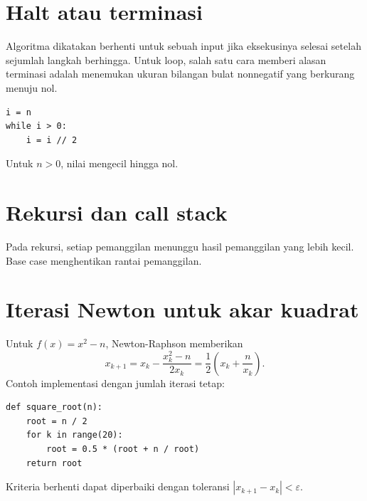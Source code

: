 \documentclass[11pt,a4paper]{report}
\newcommand{\kode}[1]{\texttt{\detokenize{#1}}}
\begin{document}
\section{Halt atau terminasi}
Algoritma dikatakan berhenti untuk sebuah input jika eksekusinya selesai setelah sejumlah langkah berhingga. Untuk loop, salah satu cara memberi alasan terminasi adalah menemukan ukuran bilangan bulat nonnegatif yang berkurang menuju nol.

\begin{lstlisting}
i = n
while i > 0:
    i = i // 2
\end{lstlisting}
Untuk $n>0$, nilai \kode{i} mengecil hingga nol.

\section{Rekursi dan call stack}
Pada rekursi, setiap pemanggilan menunggu hasil pemanggilan yang lebih kecil. Base case menghentikan rantai pemanggilan.

\section{Iterasi Newton untuk akar kuadrat}
Untuk $f(x)=x^2-n$, Newton-Raphson memberikan
\[
x_{k+1}=x_k-\frac{x_k^2-n}{2x_k}
       =\frac12\left(x_k+\frac{n}{x_k}\right).
\]
Contoh implementasi dengan jumlah iterasi tetap:
\begin{lstlisting}
def square_root(n):
    root = n / 2
    for k in range(20):
        root = 0.5 * (root + n / root)
    return root
\end{lstlisting}
Kriteria berhenti dapat diperbaiki dengan toleransi $|x_{k+1}-x_k|<\varepsilon$.
\end{document}
